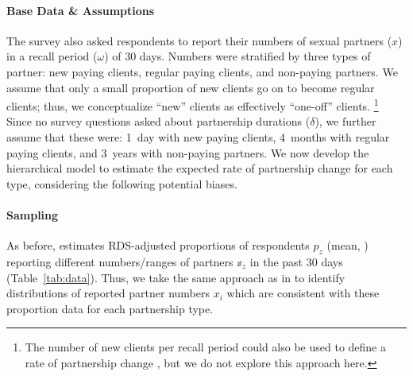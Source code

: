 \paragraph{Base Data \& Assumptions}
The survey \cite{Baral2014} also asked respondents to report
their numbers of sexual partners ($x$) in a recall period ($\omega$) of $30$ days.
Numbers were stratified by three types of partner:
new paying clients, regular paying clients, and non-paying partners.
We assume that only a small proportion of new clients go on to become regular clients;
thus, we conceptualize ``new'' clients as effectively ``one-off'' clients.%
\footnote{The number of new clients per recall period
  could also be used to define a rate of partnership change \cite{Fazito2012},
  but we do not explore this approach here.}
Since no survey questions asked about partnership durations ($\delta$),
we further assume that these were:
1~day with new paying clients,
4~months with regular paying clients, and
3~years with non-paying partners.
We now develop the hierarchical model to estimate
the expected rate of partnership change for each type,
considering the following potential biases.
\paragraph{Sampling}
As before, \cite{Baral2014} estimates RDS-adjusted proportions of respondents $p_z$ (mean, \ci)
reporting different numbers/ranges of partners $\mathbb{x}_z$ in the past 30 days
(Table~\ref{tab:data}).
Thus, we take the same approach as in 
to identify distributions of reported partner numbers $x_i$
which are consistent with these proportion data for each partnership type.
